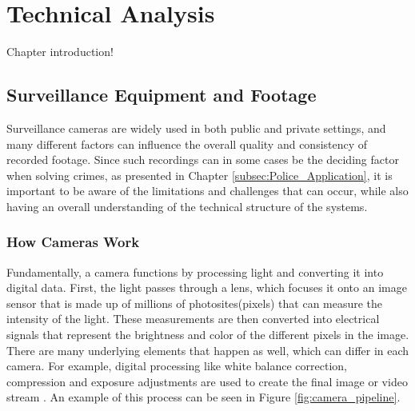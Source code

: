 \chapter{Technical Analysis}
Chapter introduction!

\section{Surveillance Equipment and Footage}
\label{subsec:Surveillance_equipment_n_footage}

Surveillance cameras are widely used in both public and private settings, and many different factors can influence the overall quality and consistency of recorded footage. Since such recordings can in some cases be the deciding factor when solving crimes, as presented in Chapter \ref{subsec:Police_Application}, it is important to be aware of the limitations and challenges that can occur, while also having an overall understanding of the technical structure of the systems\cite{arxiv_suerres2021}.
 
\subsection{How Cameras Work}
\label{subsubsec:How_cameras_work}
Fundamentally, a camera functions by processing light and converting it into digital data. First, the light passes through a lens, which focuses it onto an image sensor that is made up of millions of photosites(pixels) that can measure the intensity of the light. These measurements are then converted into electrical signals that represent the brightness and color of the different pixels in the image\cite{unc_camera_pipeline}.
There are many underlying elements that happen as well, which can differ in each camera. For example, digital processing like white balance correction, compression and exposure adjustments are used to create the final image or video stream \cite{unc_camera_pipeline}.
An example of this process can be seen in Figure \ref{fig:camera_pipeline}.

